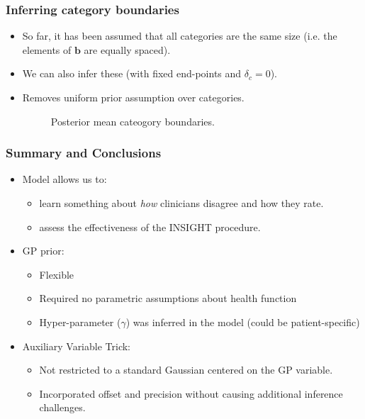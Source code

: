 \begin{frame}
	\frametitle{Inferring category boundaries}
	\begin{itemize}
		\item So far, it has been assumed that all categories are the same size (i.e. the elements of $\mathbf{b}$ are equally spaced).
		\item We can also infer these (with fixed end-points and $\delta_c=0$).
		\item Removes uniform prior assumption over categories.
	\begin{figure}[tbh]
		\hfill
		\centering\caption{\label{fig:clinicalcategories}Posterior mean cateogory boundaries.}
	\end{figure}
	\end{itemize}
\end{frame}

\begin{frame}
	\frametitle{Summary and Conclusions}
	\begin{itemize}
		\item Model allows us to:
		\begin{itemize}
			\item learn something about \emph{how} clinicians disagree and how they rate.
			\item assess the effectiveness of the INSIGHT procedure.
		\end{itemize}
		\item<2-> GP prior:
		\begin{itemize}
			\item Flexible
			\item Required no parametric assumptions about health function
			\item Hyper-parameter ($\gamma$) was inferred in the model (could be patient-specific)
		\end{itemize}
		\item<3-> Auxiliary Variable Trick:
		\begin{itemize}
			\item Not restricted to a standard Gaussian centered on the GP variable.
			\item Incorporated offset and precision without causing additional inference challenges.
		\end{itemize}
	\end{itemize}
\end{frame}

